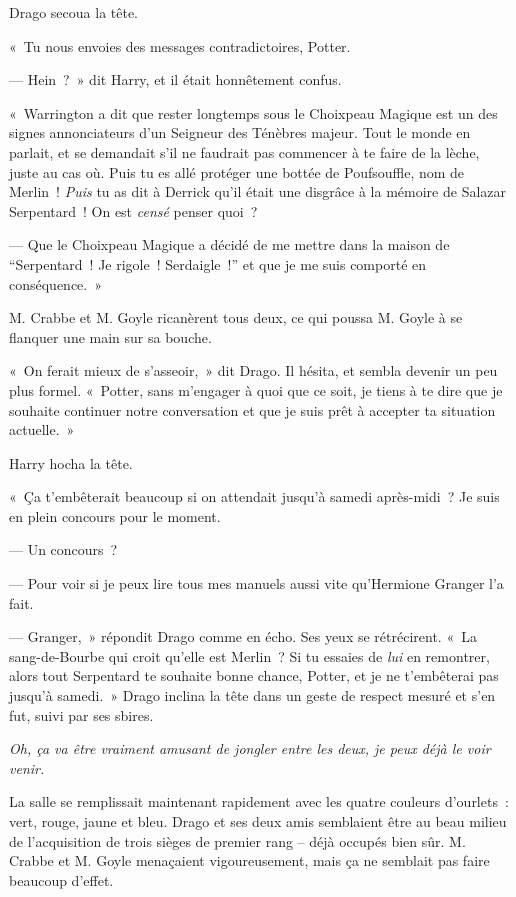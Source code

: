 Drago secoua la tête.

«~Tu nous envoies des messages contradictoires, Potter.

--- Hein~?~» dit Harry, et il était honnêtement confus.

«~Warrington a dit que rester longtemps sous le Choixpeau Magique est un des signes annonciateurs d'un Seigneur des Ténèbres majeur. Tout le monde en parlait, et se demandait s'il ne faudrait pas commencer à te faire de la lèche, juste au cas où. Puis tu es allé protéger une bottée de Poufsouffle, nom de Merlin~! \emph{Puis} tu as dit à Derrick qu'il était une disgrâce à la mémoire de Salazar Serpentard~! On est \emph{censé} penser quoi~?

--- Que le Choixpeau Magique a décidé de me mettre dans la maison de “Serpentard~! Je rigole~! Serdaigle~!” et que je me suis comporté en conséquence.~»

M. Crabbe et M. Goyle ricanèrent tous deux, ce qui poussa M. Goyle à se flanquer une main sur sa bouche.

«~On ferait mieux de s'asseoir,~» dit Drago. Il hésita, et sembla devenir un peu plus formel. «~Potter, sans m'engager à quoi que ce soit, je tiens à te dire que je souhaite continuer notre conversation et que je suis prêt à accepter ta situation actuelle.~»

Harry hocha la tête.

«~Ça t'embêterait beaucoup si on attendait jusqu'à samedi après-midi~? Je suis en plein concours pour le moment.

--- Un concours~?

--- Pour voir si je peux lire tous mes manuels aussi vite qu'Hermione Granger l'a fait.

--- Granger,~» répondit Drago comme en écho. Ses yeux se rétrécirent. «~La sang-de-Bourbe qui croit qu'elle est Merlin~? Si tu essaies de \emph{lui} en remontrer, alors tout Serpentard te souhaite bonne chance, Potter, et je ne t'embêterai pas jusqu'à samedi.~» Drago inclina la tête dans un geste de respect mesuré et s'en fut, suivi par ses sbires.

\emph{Oh, ça va être vraiment amusant de jongler entre les deux, je peux déjà le voir venir.}

La salle se remplissait maintenant rapidement avec les quatre couleurs d'ourlets~: vert, rouge, jaune et bleu. Drago et ses deux amis semblaient être au beau milieu de l'acquisition de trois sièges de premier rang -- déjà occupés bien sûr. M. Crabbe et M. Goyle menaçaient vigoureusement, mais ça ne semblait pas faire beaucoup d'effet.

